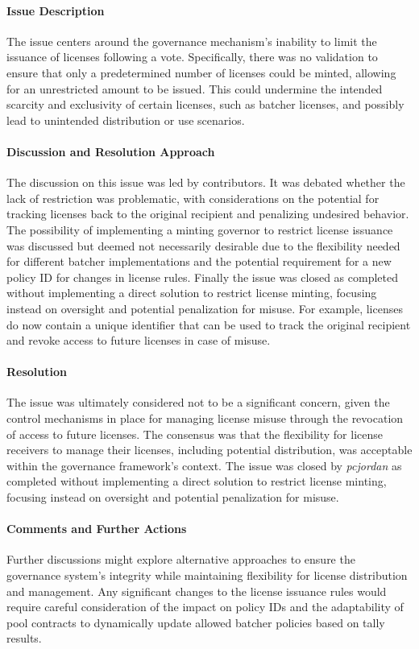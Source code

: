 \documentclass[11pt]{article}
\begin{document}
\paragraph{Issue Description}
The issue centers around the governance mechanism's inability to limit the issuance of licenses following a vote.
Specifically, there was no validation to ensure that only a predetermined number of licenses could be minted, allowing for an unrestricted amount to be issued.
This could undermine the intended scarcity and exclusivity of certain licenses, such as batcher licenses, and possibly lead to unintended distribution or use scenarios.

\paragraph{Discussion and Resolution Approach}
The discussion on this issue was led by contributors.
It was debated whether the lack of restriction was problematic, with considerations on the potential for tracking licenses back to the original recipient and penalizing undesired behavior.
The possibility of implementing a minting governor to restrict license issuance was discussed but deemed not necessarily desirable due to the flexibility needed for different batcher implementations and the potential requirement for a new policy ID for changes in license rules.
Finally the issue was closed as completed without implementing a direct solution to restrict license minting, focusing instead on oversight and potential penalization for misuse.
For example, licenses do now contain a unique identifier that can be used to track the original recipient and revoke access to future licenses in case of misuse.

\paragraph{Resolution}
The issue was ultimately considered not to be a significant concern, given the control mechanisms in place for managing license misuse through the revocation of access to future licenses. The consensus was that the flexibility for license receivers to manage their licenses, including potential distribution, was acceptable within the governance framework's context. The issue was closed by \textit{pcjordan} as completed without implementing a direct solution to restrict license minting, focusing instead on oversight and potential penalization for misuse.

\paragraph{Comments and Further Actions}
Further discussions might explore alternative approaches to ensure the governance system's integrity while maintaining flexibility for license distribution and management. Any significant changes to the license issuance rules would require careful consideration of the impact on policy IDs and the adaptability of pool contracts to dynamically update allowed batcher policies based on tally results.
\end{document}

